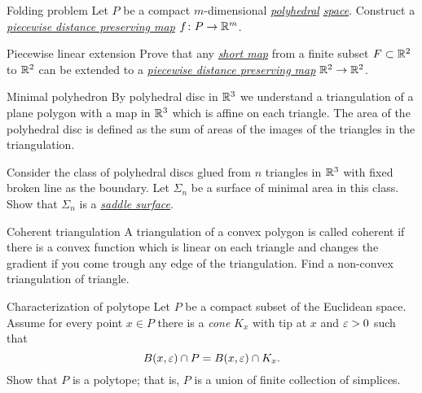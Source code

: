 \documentclass[twoside]{book}
\begin{document}
{\begin{pr}{}{Folding problem} \label{Folding problem}
Let $P$ be a compact $m$-dimensional 
\hyperref[Polyhedral space]{\emph{polyhedral}}
\hyperref[Polyhedral space]{\emph{space}}. 
Construct a 
\hyperref[Piecewise distance preserving map]{\emph{piecewise distance preserving map}} 
$f\colon P\to \mathbb{R}^m$.
\end{pr}

\begin{pr}{}{Piecewise linear extension} \label{iso-kirzhbraun}
Prove that any \hyperref[Short map]{\emph{short map}} from a finite subset $F\subset \mathbb{R}^2$
to 
$\mathbb{R}^2$ can be extended to a 
\hyperref[Piecewise distance preserving map]{\emph{piecewise distance preserving map}} 
$\mathbb{R}^2\to\mathbb{R}^2$.
\end{pr}


\begin{pr}{}{Minimal polyhedron}\label{Minimal polyhedron}
By polyhedral disc in $\mathbb{R}^3$
we understand a triangulation of a plane polygon with a map in $\mathbb{R}^3$ which is affine on each triangle.
The area of the polyhedral disc is defined as the sum of areas of the images of the triangles in the triangulation.

Consider the  class of polyhedral discs glued from $n$ triangles in $\mathbb{R}^3$ 
with fixed broken line as the boundary.
Let $\Sigma_n$ be a surface of minimal area in this class.
Show that $\Sigma_n$ is a \hyperref[Saddle surface]{\emph{saddle surface}}.
\end{pr}


\begin{pr}{}{Coherent triangulation}\label{Coherent triangulation} 
A triangulation of a convex polygon is called coherent if there is a convex function which is linear on each triangle and changes the gradient if you come trough any edge of the triangulation.
Find a non-convex triangulation of triangle.
\end{pr}

\begin{pr}{\thm}{Characterization of polytope}
\label{conic neighborhoods}
Let $P$ be a compact subset of the Euclidean space.
Assume for every point $x\in P$
there is a \emph{cone} $K_x$ with tip at $x$ and $\varepsilon>0$
such that 
$$B(x,\varepsilon)\cap P
=
B(x,\varepsilon)\cap K_x.$$
Show that $P$ is a polytope; 
that is, $P$ is a union of finite collection of simplices.
\end{pr}

}
\end{document}
